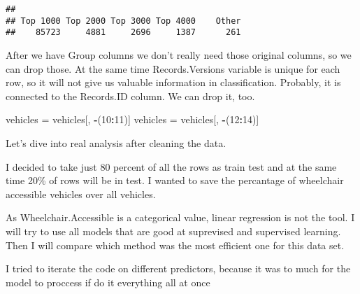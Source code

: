 \documentclass[
]{article}
\newenvironment{Shaded}{\begin{snugshade}}{\end{snugshade}}
\newcommand{\DecValTok}[1]{\textcolor[rgb]{0.00,0.00,0.81}{#1}}
\newcommand{\NormalTok}[1]{#1}
\newcommand{\OtherTok}[1]{\textcolor[rgb]{0.56,0.35,0.01}{#1}}
\newcommand{\SpecialCharTok}[1]{\textcolor[rgb]{0.81,0.36,0.00}{\textbf{#1}}}
\begin{document}
\begin{verbatim}
## 
## Top 1000 Top 2000 Top 3000 Top 4000    Other 
##    85723     4881     2696     1387      261
\end{verbatim}

After we have Group columns we don't really need those original columns,
so we can drop those. At the same time Records.Versions variable is
unique for each row, so it will not give us valuable information in
classification. Probably, it is connected to the Records.ID column. We
can drop it, too.

\begin{Shaded}
\begin{Highlighting}[]
\NormalTok{vehicles }\OtherTok{=}\NormalTok{ vehicles[, }\SpecialCharTok{{-}}\NormalTok{(}\DecValTok{10}\SpecialCharTok{:}\DecValTok{11}\NormalTok{)]}
\NormalTok{vehicles }\OtherTok{=}\NormalTok{ vehicles[, }\SpecialCharTok{{-}}\NormalTok{(}\DecValTok{12}\SpecialCharTok{:}\DecValTok{14}\NormalTok{)]}
\end{Highlighting}
\end{Shaded}

Let's dive into real analysis after cleaning the data.

I decided to take just 80 percent of all the rows as train test and at
the same time 20\% of rows will be in test. I wanted to save the
percantage of wheelchair accessible vehicles over all vehicles.

As Wheelchair.Accessible is a categorical value, linear regression is
not the tool. I will try to use all models that are good at suprevised
and supervised learning. Then I will compare which method was the most
efficient one for this data set.

I tried to iterate the code on different predictors, because it was to
much for the model to proccess if do it everything all at once
\end{document}
